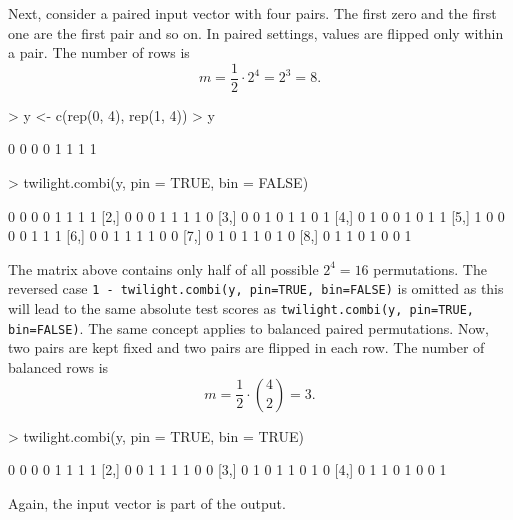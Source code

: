 \documentclass[11pt,a4paper,fleqn]{report}
\newcommand{\Rfunction}[1]{{\texttt{#1}}}
\begin{document}
Next, consider a paired input vector with four pairs. The first zero and the first one are the first pair and so on. In paired settings, values are flipped only within a pair. The number of rows is
\begin{equation}
m = \frac{1}{2} \cdot 2^4 = 2^3 = 8.
\end{equation}
\begin{Schunk}
\begin{Sinput}
> y <- c(rep(0, 4), rep(1, 4))
> y
\end{Sinput}
\begin{Soutput}
[1] 0 0 0 0 1 1 1 1
\end{Soutput}
\end{Schunk}
\begin{Schunk}
\begin{Sinput}
> twilight.combi(y, pin = TRUE, bin = FALSE)
\end{Sinput}
\begin{Soutput}
     [,1] [,2] [,3] [,4] [,5] [,6] [,7] [,8]
[1,]    0    0    0    0    1    1    1    1
[2,]    0    0    0    1    1    1    1    0
[3,]    0    0    1    0    1    1    0    1
[4,]    0    1    0    0    1    0    1    1
[5,]    1    0    0    0    0    1    1    1
[6,]    0    0    1    1    1    1    0    0
[7,]    0    1    0    1    1    0    1    0
[8,]    0    1    1    0    1    0    0    1
\end{Soutput}
\end{Schunk}
       
The matrix above contains only half of all possible $2^4=16$ permutations. The reversed case \Rfunction{1 - twilight.combi(y, pin=TRUE, bin=FALSE)} is omitted as this will lead to the same absolute test scores as \Rfunction{twilight.combi(y, pin=TRUE, bin=FALSE)}. The same concept applies to balanced paired permutations. Now, two pairs are kept fixed and two pairs are flipped in each row. The number of balanced rows is
\begin{equation}
m = \frac{1}{2} \cdot {4 \choose 2} = 3.
\end{equation}
\begin{Schunk}
\begin{Sinput}
> twilight.combi(y, pin = TRUE, bin = TRUE)
\end{Sinput}
\begin{Soutput}
     [,1] [,2] [,3] [,4] [,5] [,6] [,7] [,8]
[1,]    0    0    0    0    1    1    1    1
[2,]    0    0    1    1    1    1    0    0
[3,]    0    1    0    1    1    0    1    0
[4,]    0    1    1    0    1    0    0    1
\end{Soutput}
\end{Schunk}
Again, the input vector is part of the output.
\end{document}
